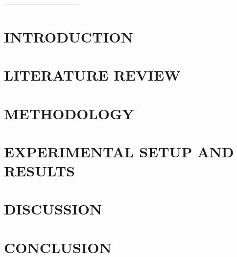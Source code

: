 \documentclass{SOICTthesis}  %
\begin{document}
\theabstract{
    \lipsum[1-2]  %
}


---------------------------------
\chapter{INTRODUCTION}



\chapter{LITERATURE REVIEW}


\chapter{METHODOLOGY}
% 

\chapter{EXPERIMENTAL SETUP AND RESULTS}

\chapter{DISCUSSION}
%
% 

\chapter{CONCLUSION}
%
% 
\end{document}

